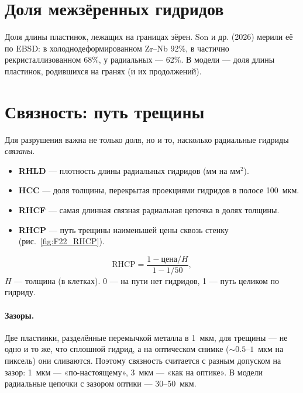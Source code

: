 \section{Доля межзёренных гидридов}

Доля длины пластинок, лежащих на границах зёрен. Son и др. (2026) мерили её по EBSD: в
холоднодеформированном Zr--Nb 92\%, в частично рекристаллизованном 68\%, у радиальных --- 62\%.
В модели --- доля длины пластинок, родившихся на гранях (и их продолжений).

\section{Связность: путь трещины}

Для разрушения важна не только доля, но и то, насколько радиальные гидриды \emph{связаны}.
\begin{itemize}
\item \textbf{RHLD} --- плотность длины радиальных гидридов (мм на мм$^2$).
\item \textbf{HCC} --- доля толщины, перекрытая проекциями гидридов в полосе 100~мкм.
\item \textbf{RHCF} --- самая длинная связная радиальная цепочка в долях толщины.
\item \textbf{RHCP} --- путь трещины наименьшей цены сквозь стенку (рис.~\ref{fig:F22_RHCP}).
\end{itemize}


\begin{keyf}
\[
\mathrm{RHCP}=\frac{1-\text{цена}/H}{1-1/50},
\]
$H$ --- толщина (в клетках). 0 --- на пути нет гидридов, 1 --- путь целиком по гидриду.
\end{keyf}

\paragraph{Зазоры.} Две пластинки, разделённые перемычкой металла в 1~мкм, для трещины --- не
одно и то же, что сплошной гидрид, а на оптическом снимке ($\sim0.5$--$1$~мкм на пиксель) они
сливаются. Поэтому связность считается с разным допуском на зазор: 1~мкм --- «по-настоящему»,
3~мкм --- «как на оптике». В модели радиальные цепочки с зазором оптики --- 30--50~мкм.

